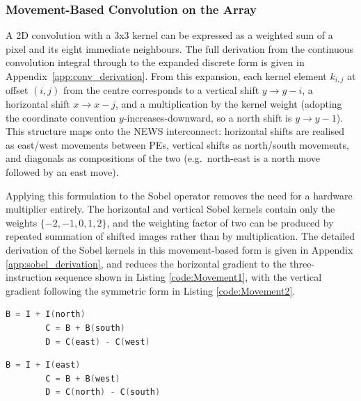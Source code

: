        \subsubsection{Movement-Based Convolution on the Array}
        \label{sec:MB_Conv}
        A 2D convolution with a 3x3 kernel can be expressed as a 
        weighted sum of a pixel and its eight immediate neighbours. The full 
        derivation from the continuous convolution integral through to the 
        expanded discrete form is given in 
        Appendix~\ref{app:conv_derivation}. From this expansion, each kernel element $k_{i,j}$ at offset $(i, j)$ from the centre corresponds to a vertical shift $y \rightarrow y - i$, a horizontal shift $x \rightarrow x - j$, and a multiplication by the kernel weight (adopting the coordinate convention $y$-increases-downward, so a north shift is $y \rightarrow y - 1$). This structure maps onto the NEWS interconnect: horizontal shifts are realised as east/west movements between PEs, vertical shifts as north/south movements, and diagonals as compositions of the two (e.g.\ north-east is a north move followed by an east move).
        
        Applying this formulation to the Sobel operator removes the need for 
        a hardware multiplier entirely. The horizontal and vertical Sobel 
        kernels contain only the weights $\{-2, -1, 0, 1, 2\}$, and the 
        weighting factor of two can be produced by repeated summation of 
        shifted images rather than by multiplication. The detailed derivation 
        of the Sobel kernels in this movement-based form is given in 
        Appendix \ref{app:sobel_derivation}, and reduces the horizontal 
        gradient to the three-instruction sequence shown in 
        Listing \ref{code:Movement1}, with the vertical gradient following 
        the symmetric form in Listing \ref{code:Movement2}. 
        
        \begin{lstlisting}[language=Verilog, caption={Gx Kernel}, label={code:Movement1},
        basicstyle=\footnotesize\ttfamily,
        aboveskip=2pt,
        belowskip=2pt,
        xleftmargin=0pt,
        framexleftmargin=0pt]
        B = I + I(north)
        C = B + B(south)
        D = C(east) - C(west)\end{lstlisting}
        
        \begin{lstlisting}[language=Verilog, caption={Gy Kernel}, label={code:Movement2},
        basicstyle=\footnotesize\ttfamily,
        aboveskip=2pt,
        belowskip=2pt,
        xleftmargin=0pt,
        framexleftmargin=0pt]
        B = I + I(east)
        C = B + B(west)
        D = C(north) - C(south)\end{lstlisting}     
            
